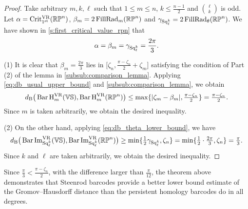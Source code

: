 \begin{proof}
	Take arbitrary $m, k, \ell$ such that $1 \leq m \leq n$, $k \leq \frac{n-1}{2}$ and $\binom{\ell}{k}$ is odd.
    Let $\alpha = \operatorname{Crit^{\mathrm{VR}}_{1^{\mathrm{st}}}}(\mathbb{RP}^n)$, $\beta_m = 2\operatorname{FillRad}_{m}(\mathbb{RP}^n)$ and $\gamma_{\operatorname{Sq}_\ell^k}= 2\operatorname{FillRad}_{\theta}(\mathbb{RP}^n)$.
    We have shown in \cref{s:first_critical_value_rpn} that
	$$
	\alpha = \beta_m = \gamma_{\operatorname{Sq}_\ell^k} = \frac{2\pi}{3}.
	$$

    (1) It is clear that %
    $\beta_m = \tfrac{2\pi}{3}$ lies in $\big[\zeta_n, \tfrac{\pi - \zeta_n}{2}+\zeta_m\big]$ satisfying the condition of Part (2) of the lemma in \cref{subsub:comparison_lemma}.
	Applying \cref{eq:db_usual_upper_bound} and \cref{subsub:comparison_lemma}, we obtain
	\[d_{\mathrm{B}}\big(\operatorname{Bar} \operatorname{H}_{m}^{\mathrm{VR}} (\mathbb{V}\mathbb{S}), \operatorname{Bar} \operatorname{H}_{m}^{\mathrm{VR}} (\mathbb{RP}^n)\big)
    \leq \max\{|\zeta_m  - \beta_m |, \tfrac{\pi - \zeta_n}{2}\}
    = \tfrac{\pi - \zeta_n}{2}.\]
    Since $m$ is taken arbitrarily, we obtain the desired inequality.

	(2) On the other hand, applying \cref{eq:db_theta_lower_bound}, we have
	\[\db\big(\sqbarcl{k}{\ell}{\VS}, \sqbarcl{k}{\ell}{\rp^n}\big)
	\geq \min\{\tfrac{1}{2}\gamma_{\Sq_\ell^k}, \zeta_n\}
	= \min\{\tfrac{1}{2}\cdot\tfrac{2\pi}{3}, \zeta_n\}
	= \tfrac{\pi}{3}.%
    \]
    Since $k$ and $\ell$ are taken arbitrarily, we obtain the desired inequality.
\end{proof}

Since \(\tfrac{\pi}{3} < \tfrac{\pi - \zeta_n}{2}\), with the difference larger than \(\tfrac{\pi}{12}\), the theorem above demonstrates that Steenrod barcodes provide a better lower bound estimate of the Gromov--Hausdorff distance than the persistent homology barcodes do in all degrees.
